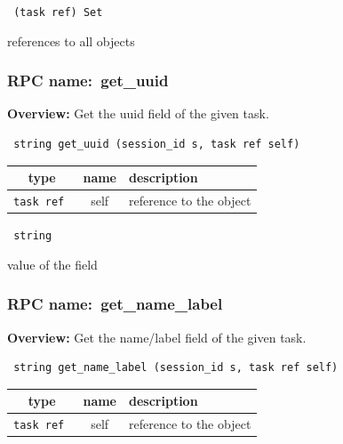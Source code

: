 \vspace{0.3cm}

{\tt 
(task ref) Set
}


references to all objects
\vspace{0.3cm}
\vspace{0.3cm}
\vspace{0.3cm}
\subsubsection{RPC name:~get\_uuid}

{\bf Overview:} 
Get the uuid field of the given task.

\begin{verbatim} string get_uuid (session_id s, task ref self)\end{verbatim}



 
\vspace{0.3cm}
\begin{tabular}{|c|c|p{7cm}|}
 \hline
{\bf type} & {\bf name} & {\bf description} \\ \hline
{\tt task ref } & self & reference to the object \\ \hline 

\end{tabular}

\vspace{0.3cm}

{\tt 
string
}


value of the field
\vspace{0.3cm}
\vspace{0.3cm}
\vspace{0.3cm}
\subsubsection{RPC name:~get\_name\_label}

{\bf Overview:} 
Get the name/label field of the given task.

\begin{verbatim} string get_name_label (session_id s, task ref self)\end{verbatim}



 
\vspace{0.3cm}
\begin{tabular}{|c|c|p{7cm}|}
 \hline
{\bf type} & {\bf name} & {\bf description} \\ \hline
{\tt task ref } & self & reference to the object \\ \hline 

\end{tabular}

